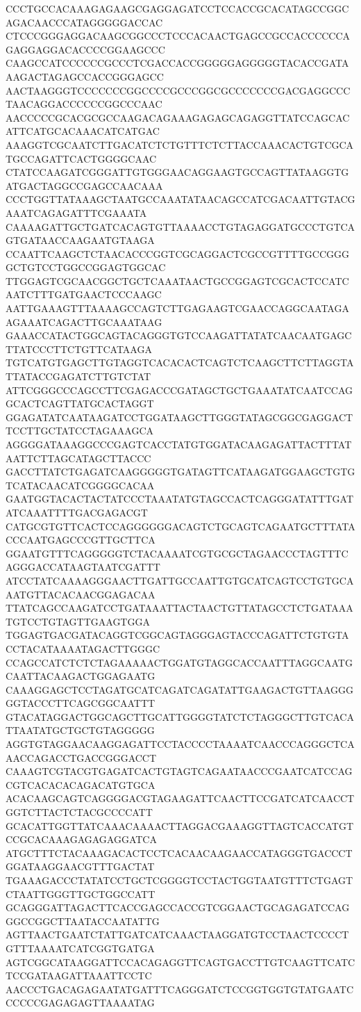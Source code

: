 CCCTGCCACAAAGAGAAGCGAGGAGATCCTCCACCGCACATAGCCGGCAGACAACCCATAGGGGGACCAC
CTCCCGGGAGGACAAGCGGCCCTCCCACAACTGAGCCGCCACCCCCCAGAGGAGGACACCCCGGAAGCCC
CAAGCCATCCCCCCGCCCTCGACCACCGGGGGAGGGGGTACACCGATAAAGACTAGAGCCACCGGGAGCC
AACTAAGGGTCCCCCCCGGCCCCGCCCGGCGCCCCCCCGACGAGGCCCTAACAGGACCCCCCGGCCCAAC
AACCCCCGCACGCGCCAAGACAGAAAGAGAGCAGAGGTTATCCAGCACATTCATGCACAAACATCATGAC
AAAGGTCGCAATCTTGACATCTCTGTTTCTCTTACCAAACACTGTCGCATGCCAGATTCACTGGGGCAAC
CTATCCAAGATCGGGATTGTGGGAACAGGAAGTGCCAGTTATAAGGTGATGACTAGGCCGAGCCAACAAA
CCCTGGTTATAAAGCTAATGCCAAATATAACAGCCATCGACAATTGTACGAAATCAGAGATTTCGAAATA
CAAAAGATTGCTGATCACAGTGTTAAAACCTGTAGAGGATGCCCTGTCAGTGATAACCAAGAATGTAAGA
CCAATTCAAGCTCTAACACCCGGTCGCAGGACTCGCCGTTTTGCCGGGGCTGTCCTGGCCGGAGTGGCAC
TTGGAGTCGCAACGGCTGCTCAAATAACTGCCGGAGTCGCACTCCATCAATCTTTGATGAACTCCCAAGC
AATTGAAAGTTTAAAAGCCAGTCTTGAGAAGTCGAACCAGGCAATAGAAGAAATCAGACTTGCAAATAAG
GAAACCATACTGGCAGTACAGGGTGTCCAAGATTATATCAACAATGAGCTTATCCCTTCTGTTCATAAGA
TGTCATGTGAGCTTGTAGGTCACACACTCAGTCTCAAGCTTCTTAGGTATTATACCGAGATCTTGTCTAT
ATTCGGGCCCAGCCTTCGAGACCCGATAGCTGCTGAAATATCAATCCAGGCACTCAGTTATGCACTAGGT
GGAGATATCAATAAGATCCTGGATAAGCTTGGGTATAGCGGCGAGGACTTCCTTGCTATCCTAGAAAGCA
AGGGGATAAAGGCCCGAGTCACCTATGTGGATACAAGAGATTACTTTATAATTCTTAGCATAGCTTACCC
GACCTTATCTGAGATCAAGGGGGTGATAGTTCATAAGATGGAAGCTGTGTCATACAACATCGGGGCACAA
GAATGGTACACTACTATCCCTAAATATGTAGCCACTCAGGGATATTTGATATCAAATTTTGACGAGACGT
CATGCGTGTTCACTCCAGGGGGGACAGTCTGCAGTCAGAATGCTTTATACCCAATGAGCCCGTTGCTTCA
GGAATGTTTCAGGGGGTCTACAAAATCGTGCGCTAGAACCCTAGTTTCAGGGACCATAAGTAATCGATTT
ATCCTATCAAAAGGGAACTTGATTGCCAATTGTGCATCAGTCCTGTGCAAATGTTACACAACGGAGACAA
TTATCAGCCAAGATCCTGATAAATTACTAACTGTTATAGCCTCTGATAAATGTCCTGTAGTTGAAGTGGA
TGGAGTGACGATACAGGTCGGCAGTAGGGAGTACCCAGATTCTGTGTACCTACATAAAATAGACTTGGGC
CCAGCCATCTCTCTAGAAAAACTGGATGTAGGCACCAATTTAGGCAATGCAATTACAAGACTGGAGAATG
CAAAGGAGCTCCTAGATGCATCAGATCAGATATTGAAGACTGTTAAGGGGGTACCCTTCAGCGGCAATTT
GTACATAGGACTGGCAGCTTGCATTGGGGTATCTCTAGGGCTTGTCACATTAATATGCTGCTGTAGGGGG
AGGTGTAGGAACAAGGAGATTCCTACCCCTAAAATCAACCCAGGGCTCAAACCAGACCTGACCGGGACCT
CAAAGTCGTACGTGAGATCACTGTAGTCAGAATAACCCGAATCATCCAGCGTCACACACAGACATGTGCA
ACACAAGCAGTCAGGGGACGTAGAAGATTCAACTTCCGATCATCAACCTGGTCTTACTCTACGCCCCATT
GCACATTGGTTATCAAACAAAACTTAGGACGAAAGGTTAGTCACCATGTCCGCACAAAGAGAGAGGATCA
ATGCTTTCTACAAAGACACTCCTCACAACAAGAACCATAGGGTGACCCTGGATAAGGAACGTTTGACTAT
TGAAAGACCCTATATCCTGCTCGGGGTCCTACTGGTAATGTTTCTGAGTCTAATTGGGTTGCTGGCCATT
GCAGGGATTAGACTTCACCGAGCCACCGTCGGAACTGCAGAGATCCAGGGCCGGCTTAATACCAATATTG
AGTTAACTGAATCTATTGATCATCAAACTAAGGATGTCCTAACTCCCCTGTTTAAAATCATCGGTGATGA
AGTCGGCATAAGGATTCCACAGAGGTTCAGTGACCTTGTCAAGTTCATCTCCGATAAGATTAAATTCCTC
AACCCTGACAGAGAATATGATTTCAGGGATCTCCGGTGGTGTATGAATCCCCCCGAGAGAGTTAAAATAG
